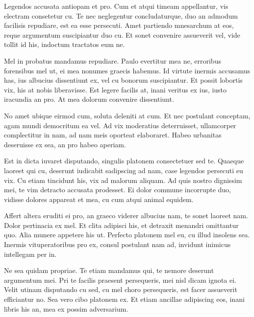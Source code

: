 \documentclass[journal,letterpaper]{article}
\begin{document}
    Legendos accusata antiopam et pro. Cum et atqui timeam appellantur, vis electram consetetur cu. Te nec neglegentur concludaturque, duo an admodum facilisis repudiare, est ea esse persecuti. Amet partiendo mnesarchum at eos, reque argumentum suscipiantur duo cu. Et sonet convenire assueverit vel, vide tollit id his, indoctum tractatos eum ne.

    Mel in probatus mandamus repudiare. Paulo evertitur mea ne, erroribus forensibus mel ut, ei mea nonumes graecis habemus. Id virtute inermis accusamus has, ius albucius dissentiunt ex, vel cu bonorum suscipiantur. Et possit lobortis vix, his at nobis liberavisse. Est legere facilis at, inani veritus ex ius, iusto iracundia an pro. At mea dolorum convenire dissentiunt.

    No amet ubique eirmod cum, soluta deleniti at cum. Et nec postulant conceptam, agam mundi democritum ea vel. Ad vix moderatius deterruisset, ullamcorper complectitur in nam, ad nam meis oporteat elaboraret. Habeo urbanitas deseruisse ex sea, an pro habeo aperiam.

    Est in dicta iuvaret disputando, singulis platonem consectetuer sed te. Quaeque laoreet qui cu, deserunt iudicabit sadipscing ad nam, case legendos persecuti eu vix. Cu etiam tincidunt his, vix ad malorum aliquam. Ad quis nostro dignissim mei, te vim detracto accusata prodesset. Ei dolor commune incorrupte duo, vidisse dolores appareat et mea, cu cum atqui animal equidem.

    Affert altera eruditi ei pro, an graeco viderer albucius nam, te sonet laoreet nam. Dolor pertinacia ex mel. Et clita adipisci his, et detraxit menandri omittantur quo. Alia munere appetere his ut. Perfecto platonem mel eu, cu illud insolens sea. Inermis vituperatoribus pro ex, consul postulant nam ad, invidunt inimicus intellegam per in.

    Ne sea quidam propriae. Te etiam mandamus qui, te nemore deserunt argumentum mei. Pri te facilis praesent persequeris, mei nisl dicam ignota ei. Velit utinam disputando cu sed, cu mel choro persequeris, est facer assueverit efficiantur no. Sea vero cibo platonem ex. Et etiam ancillae adipiscing eos, inani libris his an, mea ex possim adversarium.
\end{document}
